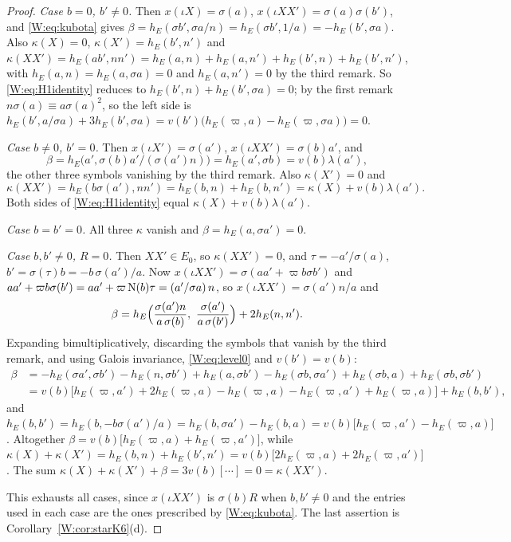 \begin{proof}
\emph{Case $b=0$, $b'\ne0$.}  Then $x(\iota X)=\sigma(a)$,
$x(\iota XX')=\sigma(a)\sigma(b')$, and \eqref{W:eq:kubota} gives
$\beta=h_E(\sigma b',\sigma a/n)=h_E(\sigma b',1/a)=-h_E(b',\sigma a)$.  Also
$\kappa(X)=0$, $\kappa(X')=h_E(b',n')$ and
$\kappa(XX')=h_E(ab',nn')=h_E(a,n)+h_E(a,n')+h_E(b',n)+h_E(b',n')$, with
$h_E(a,n)=h_E(a,\sigma a)=0$ and $h_E(a,n')=0$ by the third remark.  So
\eqref{W:eq:H1identity} reduces to $h_E(b',n)+h_E(b',\sigma a)=0$; by the
first remark $n\sigma(a)\equiv a\sigma(a)^2$, so the left side is
$h_E(b',a/\sigma a)+3h_E(b',\sigma a)=v(b')\bigl(h_E(\varpi,a)-h_E(\varpi,\sigma a)\bigr)=0$.

\emph{Case $b\ne0$, $b'=0$.}  Then $x(\iota X')=\sigma(a')$,
$x(\iota XX')=\sigma(b)a'$, and
\[\beta=h_E\bigl(a',\sigma(b)a'/(\sigma(a')n)\bigr)=h_E(a',\sigma b)=v(b)\lambda(a'),\]
the other three symbols vanishing by the third remark.  Also
$\kappa(X')=0$ and
\[\kappa(XX')=h_E(b\sigma(a'),nn')=h_E(b,n)+h_E(b,n')=\kappa(X)+v(b)\lambda(a').\]
Both sides of \eqref{W:eq:H1identity} equal $\kappa(X)+v(b)\lambda(a')$.

\emph{Case $b=b'=0$.}  All three $\kappa$ vanish and
$\beta=h_E(a,\sigma a')=0$.

\emph{Case $b,b'\ne0$, $R=0$.}  Then $XX'\in E_0$, so $\kappa(XX')=0$,
and $\tau=-a'/\sigma(a)$, $b'=\sigma(\tau)b=-b\,\sigma(a')/a$.  Now
$x(\iota XX')=\sigma(aa'+\varpi b\sigma b')$ and
$aa'+\varpi b\sigma(b')=aa'+\varpi\operatorname N(b)\tau=(a'/\sigma a)\,n$, so
$x(\iota XX')=\sigma(a')n/a$ and
\[
 \beta=h_E\Bigl(\frac{\sigma(a')n}{a\,\sigma(b)},\ \frac{\sigma(a')}{a\,\sigma(b')}\Bigr)+2h_E(n,n').
\]
Expanding bimultiplicatively, discarding the symbols that vanish by the
third remark, and using Galois invariance, \eqref{W:eq:level0} and
$v(b')=v(b)$:
\begin{align*}
 \beta&=-h_E(\sigma a',\sigma b')-h_E(n,\sigma b')+h_E(a,\sigma b')-h_E(\sigma b,\sigma a')+h_E(\sigma b,a)+h_E(\sigma b,\sigma b')\\
 &=v(b)\bigl[h_E(\varpi,a')+2h_E(\varpi,a)-h_E(\varpi,a)-h_E(\varpi,a')+h_E(\varpi,a)\bigr]+h_E(b,b'),
\end{align*}
and $h_E(b,b')=h_E(b,-b\sigma(a')/a)=h_E(b,\sigma a')-h_E(b,a)=v(b)\bigl[h_E(\varpi,a')-h_E(\varpi,a)\bigr]$.
Altogether $\beta=v(b)\bigl[h_E(\varpi,a)+h_E(\varpi,a')\bigr]$, while
$\kappa(X)+\kappa(X')=h_E(b,n)+h_E(b',n')=v(b)\bigl[2h_E(\varpi,a)+2h_E(\varpi,a')\bigr]$.
The sum $\kappa(X)+\kappa(X')+\beta=3v(b)[\cdots]=0=\kappa(XX')$.

This exhausts all cases, since $x(\iota XX')$ is $\sigma(b)R$ when
$b,b'\ne0$ and the entries used in each case are the ones prescribed by
\eqref{W:eq:kubota}.  The last assertion is Corollary~\ref{W:cor:starK6}(d).
\end{proof}

